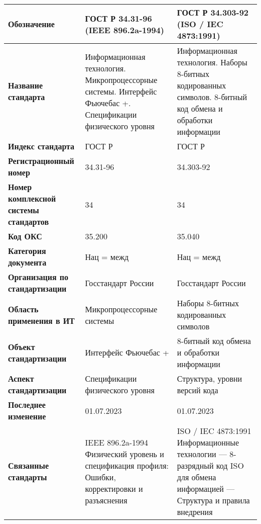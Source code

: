 \begin{table}[h!tp]
	\small
	\centering
	\caption{}
	\label{table:national:international}
	\begin{tabular}{|p{10em}|p{14em}|p{14em}|}
		\hline
		\textbf{Обозначение}
			& \textbf{ГОСТ Р 34.31-96 (IEEE 896.2a-1994)}
			& \textbf{ГОСТ Р 34.303-92 (ISO / IEC 4873:1991)} \\ \hline
		\textbf{Название стандарта}
			& Информационная технология. Микропроцессорные системы. Интерфейс Фьючебас +. Спецификации физического уровня
			& Информационная технология. Наборы 8-битных кодированных символов. 8-битный код обмена и обработки информации \\ \hline
		\textbf{Индекс стандарта}
			& ГОСТ Р & ГОСТ Р  \\ \hline
		\textbf{Регистрационный номер}
			& 34.31-96 & 34.303-92 \\ \hline
		\textbf{Номер комплексной системы стандартов}
			& 34 & 34 \\ \hline
		\textbf{Код ОКС}
			& 35.200 & 35.040 \\ \hline
		\textbf{Категория документа}
			& Нац = межд & Нац = межд \\ \hline
		\textbf{Организация по стандартизации}
			& Госстандарт России
			& Госстандарт России \\ \hline
		\textbf{Область применения в ИТ}
			& Микропроцессорные системы
			& Наборы 8-битных кодированных символов \\ \hline
		\textbf{Объект стандартизации}
			& Интерфейс Фьючебас +
			& 8-битный код обмена и обработки информации \\ \hline
		\textbf{Аспект стандартизации}
			& Спецификации физического уровня
			& Структура, уровни версий кода\\ \hline
		\textbf{Последнее изменение}
			& 01.07.2023 & 01.07.2023 \\ \hline
		\textbf{Связанные стандарты}
			& IEEE 896.2a-1994 Физический уровень и спецификация профиля: Ошибки, корректировки и разъяснения
            & ISO / IEC 4873:1991 Информационные технологии — 8-разрядный код ISO для обмена информацией — Структура и правила внедрения \\ \hline
	\end{tabular}
\end{table}

